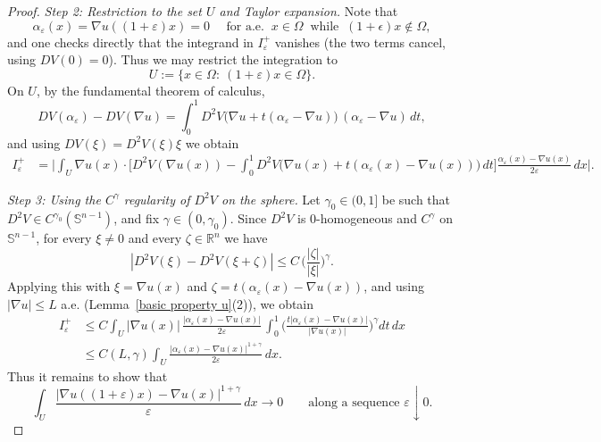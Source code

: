 \documentclass[reqno,11pt]{amsart}
\def\ez{\epsilon}
\numberwithin{equation}{section}
\theoremstyle{remark}
\begin{document}
\begin{proof}
\medskip
\noindent\textit{Step 2: Restriction to the set $U$ and Taylor expansion.}
Note that
$$\alpha_\varepsilon(x)=\nabla u((1+\varepsilon)x)=0  \quad \text{ for a.e.  } \ x\in \Omega \ \text{ while } \ (1+\ez)x\notin \Omega,$$ 
and one checks directly that
the integrand in $I_\varepsilon^+$ vanishes (the two terms cancel, using $DV(0)=0$).
Thus we may restrict the integration to
\[
U:=\{x\in\Omega:\ (1+\varepsilon)x\in\Omega\}.
\]
On $U$, by the fundamental theorem of calculus,
\[
DV(\alpha_\varepsilon)-DV(\nabla u)
=\int_0^1 D^2V\bigl(\nabla u+t(\alpha_\varepsilon-\nabla u)\bigr)\,(\alpha_\varepsilon-\nabla u)\,dt,
\]
and using $DV(\xi)=D^2V(\xi)\xi$ we obtain
\begin{align*}
I_\varepsilon^+
&=\Bigg|\int_{U}\nabla u(x)\cdot \Bigg[
D^2V(\nabla u(x))
-\int_0^1 D^2V\bigl(\nabla u(x)+t(\alpha_\varepsilon(x)-\nabla u(x))\bigr)\,dt
\Bigg]\frac{\alpha_\varepsilon(x)-\nabla u(x)}{2\varepsilon}\,dx\Bigg|.
\end{align*}

\medskip
\noindent\textit{Step 3: Using the $C^\gamma$ regularity of $D^2V$ on the sphere.}
Let $\gamma_0 \in (0,1]$ be such that $D^2V\in C^{\gamma_0}(\mathbb S^{n-1})$, and fix $\gamma \in (0,\gamma_0)$.
Since $D^2V$ is $0$-homogeneous and $C^\gamma$ on $\mathbb S^{n-1}$, for every $\xi\neq 0$ and every $\zeta\in\mathbb R^n$ we have
\[
|D^2V(\xi)-D^2V(\xi+\zeta)|
\le C\,\bigg(\frac{|\zeta|}{|\xi|}\bigg)^\gamma.
\]
Applying this with $\xi=\nabla u(x)$ and $\zeta=t(\alpha_\varepsilon(x)-\nabla u(x))$, and using $|\nabla u|\le L$ a.e.
(Lemma~\ref{basic property u}(2)), we obtain
\begin{align*}
I_\varepsilon^+
&\le C\int_U |\nabla u(x)|\,\frac{|\alpha_\varepsilon(x)-\nabla u(x)|}{2\varepsilon}\,
\int_0^1 \bigg(\frac{t|\alpha_\varepsilon(x)-\nabla u(x)|}{|\nabla u(x)|}\bigg)^\gamma dt\,dx\\
&\le C(L,\gamma)\int_U \frac{|\alpha_\varepsilon(x)-\nabla u(x)|^{1+\gamma}}{2\varepsilon}\,dx.
\end{align*}
Thus it remains to show that
\begin{equation}\label{eq:goal-alpha}
\int_U \frac{|\nabla u((1+\varepsilon)x)-\nabla u(x)|^{1+\gamma}}{\varepsilon}\,dx\to 0
\qquad\text{along a sequence }\varepsilon\downarrow 0.
\end{equation}


\end{proof}
\end{document}
